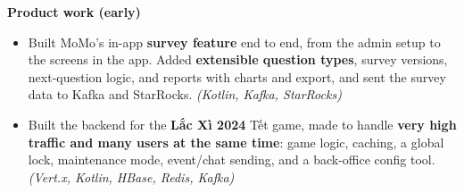 \documentclass[10pt,a4paper]{article}
\begin{document}
\smallskip\textbf{Product work (early)}
\begin{itemize}
  \item Built MoMo's in-app \textbf{survey feature} end to end, from the admin setup to the screens in the app. Added \textbf{extensible question types}, survey versions, next-question logic, and reports with charts and export, and sent the survey data to Kafka and StarRocks. \textit{(Kotlin, Kafka, StarRocks)}
  \item Built the backend for the \textbf{Lắc Xì 2024} Tết game, made to handle \textbf{very high traffic and many users at the same time}: game logic, caching, a global lock, maintenance mode, event/chat sending, and a back-office config tool. \textit{(Vert.x, Kotlin, HBase, Redis, Kafka)}
\end{itemize}
\end{document}
